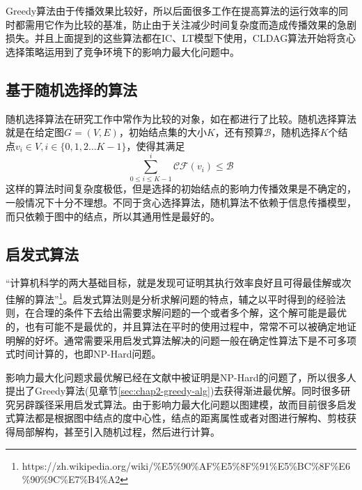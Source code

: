 Greedy算法由于传播效果比较好，所以后面很多工作在提高算法的运行效率的同时都需用它作为比较的基准，防止由于关注减少时间复杂度而造成传播效果的急剧损失。并且上面提到的这些算法都在IC、LT模型下使用，CLDAG算法开始将贪心选择策略运用到了竞争环境下的影响力最大化问题中。


\subsection{基于随机选择的算法}
\label{sec:chap2-random-alg}
随机选择算法在研究工作中常作为比较的对象，如在\cite{kempe2003maximizing}\cite{chen2009efficient}\cite{hu2015rmdn}都进行了比较。随机选择算法就是在给定图$G=(V, E)$，初始结点集的大小$K$，还有预算$\mathcal{B}$，随机选择$K$个结点$v_{i} \in V, i \in \{0, 1, 2 \dots K-1\}$，使得其满足
\begin{displaymath}
\sum_{0 \leq i \leq K-1}^{i} \mathcal{CF}(v_{i}) \leq \mathcal{B}
\end{displaymath}
这样的算法时间复杂度极低，但是选择的初始结点的影响力传播效果是不确定的，一般情况下十分不理想。不同于贪心选择算法，随机算法不依赖于信息传播模型，而只依赖于图中的结点，所以其通用性是最好的。


\subsection{启发式算法}
\label{sec:chap2-heuristic-alg}
“计算机科学的两大基础目标，就是发现可证明其执行效率良好且可得最佳解或次佳解的算法”\footnote{https://zh.wikipedia.org/wiki/\%E5\%90\%AF\%E5\%8F\%91\%E5\%BC\%8F\%E6\%90\%9C\%E7\%B4\%A2}。启发式算法则是分析求解问题的特点，辅之以平时得到的经验法则，在合理的条件下去给出需要求解问题的一个或者多个解，这个解可能是最优的，也有可能不是最优的，并且算法在平时的使用过程中，常常不可以被确定地证明解的好坏。通常需要采用启发式算法解决的问题一般在确定性算法下是不可多项式时间计算的，也即NP-Hard问题。


影响力最大化问题求最优解已经在文献\cite{kempe2003maximizing}中被证明是NP-Hard的问题了，所以很多人提出了Greedy算法(见章节\ref{sec:chap2-greedy-alg})去获得渐进最优解。同时很多研究\cite{chen2010scalableKDD}\cite{chen2010scalableICDM}\cite{chen2009efficient}\cite{hu2015rmdn}另辟蹊径采用启发式算法。由于影响力最大化问题以图建模，故而目前很多启发式算法都是根据图中结点的度中心性\cite{bonacich1972factoring}，结点的距离属性\cite{kimura2006tractable}或者对图进行解构、剪枝获得局部解构，甚至引入随机过程\cite{hu2015rmdn}，然后进行计算。


